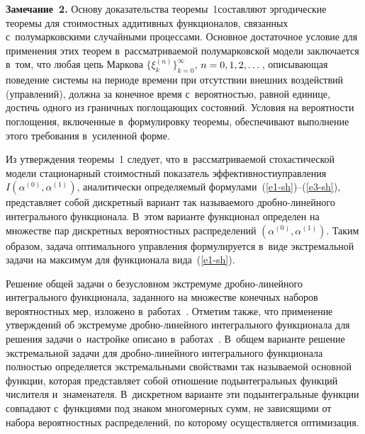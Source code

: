 \begin{multicols}{2}
\noindent
\textbf{Замечание~2.} Основу доказательства тео\-ре\-мы~1\linebreak со\-став\-ля\-ют эргодические 
теоремы для стоимостных аддитивных функционалов, связанных с~полумарковскими 
случайными процессами. Основное достаточное условие для применения этих \mbox{тео\-рем} 
в~рас\-смат\-ри\-ва\-емой полумарковской модели заключается в~том, что любая цепь Маркова 
$\{ \xi _{k}^{(n)} \}_{k=0}^{\infty}$, $n\hm=0,1,2,\dots$, опи\-сы\-ва\-ющая 
поведение системы на периоде времени при отсутствии внеш\-них воздействий 
(управлений), должна за конечное время с~ве\-ро\-ят\-ностью, равной единице, достичь 
одного из граничных поглощающих состояний. Условия на вероятности по\-гло\-ще\-ния, 
включенные в~формулировку тео\-ре\-мы, обеспечивают выполнение этого требования в~усиленной форме.

\smallskip


Из утверждения теоремы~1 следует, что в~рас\-смат\-ри\-ва\-емой стохастической модели 
стационарный стоимостный показатель эф\-фек\-тив\-ности\linebreak управ\-ле\-ния 
$I(\alpha^{(0)}, \alpha^{(1)})$, аналитически опре\-де\-ля\-емый формулами~(\ref{e1-sh})--(\ref{e3-sh}), 
пред\-став\-ля\-ет собой дискретный вариант так называемого дроб\-но-ли\-ней\-но\-го 
интегрального функционала. В~этом \mbox{варианте} функционал определен на множестве пар 
дискретных вероятностных распределений $(\alpha^{(0)}, 
\alpha^{(1)})$.
Таким образом, задача оптимального управ\-ле\-ния формулируется в~виде экстремальной 
задачи на максимум для функционала вида~(\ref{e1-sh}).

Решение общей задачи о безусловном экстремуме дроб\-но-ли\-ней\-но\-го интегрального 
функционала, заданного на множестве конечных наборов вероятностных мер, изложено в~работах~\cite{A2, A3}. Отметим также, что применение утверж\-де\-ний об экстремуме 
дроб\-но-ли\-ней\-но\-го интегрального функционала для решения задачи о~настройке 
описано в~работах~\cite{A1, A4}. В~общем варианте решение экстремальной задачи 
для дроб\-но-ли\-ней\-но\-го интегрального функционала пол\-ностью определяется 
экстремальными свойствами так называемой основной функции, которая пред\-став\-ля\-ет 
собой отношение подынтегральных функций чис\-ли\-те\-ля и~знаменателя. В~дискретном 
варианте эти подынтегральные функции совпадают с~функциями под знаком 
многомерных сумм, не зависящими от набора вероятностных распределений, по 
которому осуществляется оптимизация.


\end{multicols}
